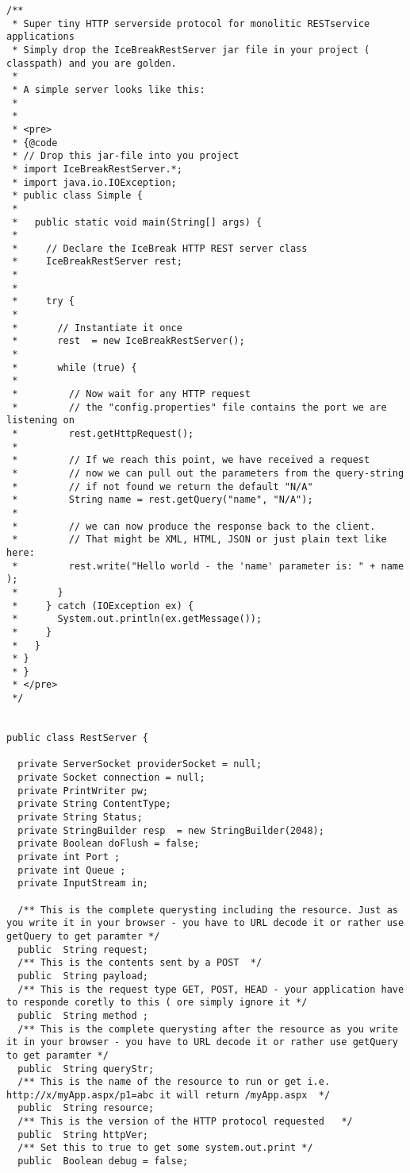 \begin{lstlisting}
/**
 * Super tiny HTTP serverside protocol for monolitic RESTservice applications
 * Simply drop the IceBreakRestServer jar file in your project ( classpath) and you are golden.
 *
 * A simple server looks like this:
 *
 *
 * <pre>
 * {@code
 * // Drop this jar-file into you project
 * import IceBreakRestServer.*;
 * import java.io.IOException;
 * public class Simple {
 *
 *   public static void main(String[] args) {
 *
 *     // Declare the IceBreak HTTP REST server class
 *     IceBreakRestServer rest;
 *
 *
 *     try {
 *
 *       // Instantiate it once
 *       rest  = new IceBreakRestServer();
 *
 *       while (true) {
 *
 *         // Now wait for any HTTP request
 *         // the "config.properties" file contains the port we are listening on
 *         rest.getHttpRequest();
 *
 *         // If we reach this point, we have received a request
 *         // now we can pull out the parameters from the query-string
 *         // if not found we return the default "N/A"
 *         String name = rest.getQuery("name", "N/A");
 *
 *         // we can now produce the response back to the client.
 *         // That might be XML, HTML, JSON or just plain text like here:
 *         rest.write("Hello world - the 'name' parameter is: " + name );
 *       }
 *     } catch (IOException ex) {
 *       System.out.println(ex.getMessage());
 *     }
 *   }
 * }
 * }
 * </pre>
 */


public class RestServer {

  private ServerSocket providerSocket = null;
  private Socket connection = null;
  private PrintWriter pw;
  private String ContentType;
  private String Status;
  private StringBuilder resp  = new StringBuilder(2048);
  private Boolean doFlush = false;
  private int Port ;
  private int Queue ;
  private InputStream in;

  /** This is the complete querysting including the resource. Just as you write it in your browser - you have to URL decode it or rather use getQuery to get paramter */
  public  String request;
  /** This is the contents sent by a POST  */
  public  String payload;
  /** This is the request type GET, POST, HEAD - your application have to responde coretly to this ( ore simply ignore it */
  public  String method ;
  /** This is the complete querysting after the resource as you write it in your browser - you have to URL decode it or rather use getQuery to get paramter */
  public  String queryStr;
  /** This is the name of the resource to run or get i.e. http://x/myApp.aspx/p1=abc it will return /myApp.aspx  */
  public  String resource;
  /** This is the version of the HTTP protocol requested   */
  public  String httpVer;
  /** Set this to true to get some system.out.print */
  public  Boolean debug = false; 


\end{lstlisting}
